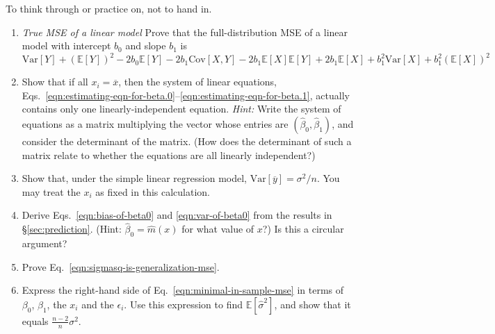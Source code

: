 \documentclass{article}
\newcommand{\Expect}[1]{\mathbb{E}\left[ #1 \right]}
\newcommand{\Var}[1]{\mathrm{Var}\left[ #1 \right]}
\newcommand{\Cov}[1]{\mathrm{Cov}\left[ #1 \right]}
\begin{document}
To think through or practice on, not to hand in.

\begin{enumerate}
\item {\em True MSE of a linear model} Prove that the full-distribution MSE of
  a linear model with intercept $b_0$ and slope $b_1$ is
  \begin{equation}
  \Var{Y} + (\Expect{Y})^2 - 2b_0 \Expect{Y} - 2b_1 \Cov{X,Y} - 2
  b_1\Expect{X}\Expect{Y} + 2b_1 \Expect{X} + b_1^2\Var{X} + b_1^2
  (\Expect{X})^2
  \end{equation}
\item \label{exercise:linear-systems-of-estimating-equations} Show that if all
  $x_i = \overline{x}$, then the system of linear equations, Eqs.\
  \ref{eqn:estimating-eqn-for-beta.0}--\ref{eqn:estimating-eqn-for-beta.1},
  actually contains only one linearly-independent equation.  {\em Hint:} Write
  the system of equations as a matrix multiplying the vector whose entries are
  $(\hat{\beta}_0, \hat{\beta}_1)$, and consider the determinant of the matrix.
  (How does the determinant of such a matrix relate to whether the equations
  are all linearly independent?)
\item \label{exercise:variance-of-y-bar} Show that, under the simple linear
  regression model, $\Var{\overline{y}} = \sigma^2/n$.  You may treat the $x_i$
  as fixed in this calculation.
\item Derive Eqs.\ \ref{eqn:bias-of-beta0} and \ref{eqn:var-of-beta0} from the
  results in \S \ref{sec:prediction}.  (Hint: $\hat{\beta}_0 = \hat{m}(x)$ for
  what value of $x$?)  Is this a circular argument?
\item \label{exercise:sigmasq-is-generalization-mse} Prove Eq.\ \ref{eqn:sigmasq-is-generalization-mse}.
\item \label{exercise:debiasing-mse} Express the right-hand side of Eq.\ \ref{eqn:minimal-in-sample-mse} in
  terms of $\beta_0$, $\beta_1$, the $x_i$ and the $\epsilon_i$.  Use this
  expression to find $\Expect{\hat{\sigma}^2}$, and show that it equals
  $\frac{n-2}{n}\sigma^2$.
\end{enumerate}



\end{document}
